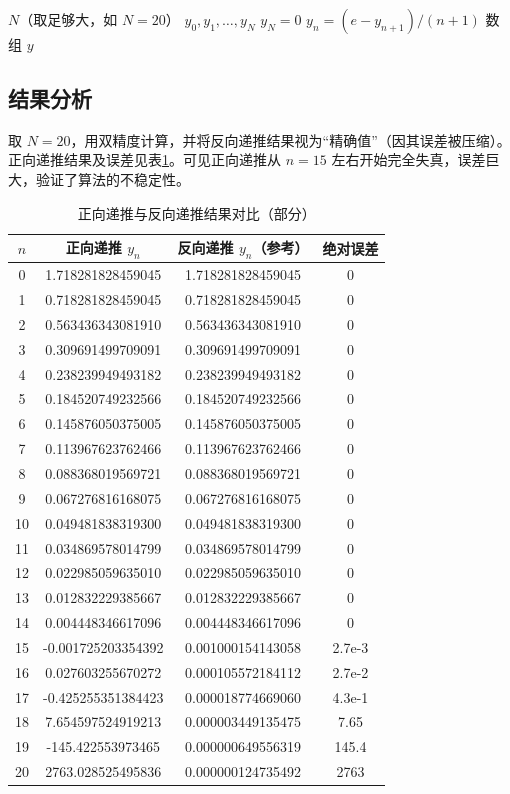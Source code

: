 \documentclass{article}
\begin{document}
\begin{algorithm}[H]
\caption{反向稳定递推}
\begin{algorithmic}[1]
\REQUIRE \(N\)（取足够大，如 \(N=20\)）
\ENSURE \(y_0, y_1, \dots, y_N\)
\STATE \(y_N = 0\) 
    \STATE \(y_n = (e - y_{n+1}) / (n+1)\)
\ENDFOR
\RETURN 数组 \(y\)
\end{algorithmic}
\end{algorithm}

\subsection{结果分析}
取 \(N=20\)，用双精度计算，并将反向递推结果视为“精确值”（因其误差被压缩）。正向递推结果及误差见表\ref{tab:q2}。可见正向递推从 \(n=15\) 左右开始完全失真，误差巨大，验证了算法的不稳定性。

\begin{table}[htbp]
\centering
\caption{正向递推与反向递推结果对比（部分）}
\label{tab:q2}
\begin{tabular}{|c|c|c|c|}
\hline
\(n\) & 正向递推 \(y_n\) & 反向递推 \(y_n\)（参考） & 绝对误差 \\
\hline
0 & 1.718281828459045 & 1.718281828459045 & 0 \\
1 & 0.718281828459045 & 0.718281828459045 & 0 \\
2 & 0.563436343081910 & 0.563436343081910 & 0 \\
3 & 0.309691499709091 & 0.309691499709091 & 0 \\
4 & 0.238239949493182 & 0.238239949493182 & 0 \\
5 & 0.184520749232566 & 0.184520749232566 & 0 \\
6 & 0.145876050375005 & 0.145876050375005 & 0 \\
7 & 0.113967623762466 & 0.113967623762466 & 0 \\
8 & 0.088368019569721 & 0.088368019569721 & 0 \\
9 & 0.067276816168075 & 0.067276816168075 & 0 \\
10 & 0.049481838319300 & 0.049481838319300 & 0 \\
11 & 0.034869578014799 & 0.034869578014799 & 0 \\
12 & 0.022985059635010 & 0.022985059635010 & 0 \\
13 & 0.012832229385667 & 0.012832229385667 & 0 \\
14 & 0.004448346617096 & 0.004448346617096 & 0 \\
15 & -0.001725203354392 & 0.001000154143058 & 2.7e-3 \\
16 & 0.027603255670272 & 0.000105572184112 & 2.7e-2 \\
17 & -0.425255351384423 & 0.000018774669060 & 4.3e-1 \\
18 & 7.654597524919213 & 0.000003449135475 & 7.65 \\
19 & -145.422553973465 & 0.000000649556319 & 145.4 \\
20 & 2763.028525495836 & 0.000000124735492 & 2763 \\
\hline
\end{tabular}
\end{table}
\end{document}
